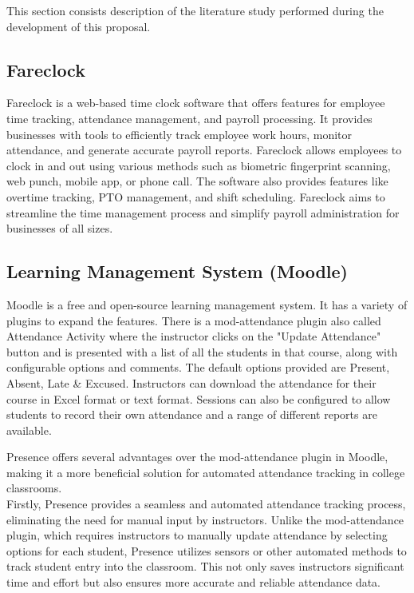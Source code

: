 This section consists description of the literature study performed during the development of this proposal.

\subsection{Fareclock}
Fareclock\cite{fareclock} is a web-based time clock software that offers features for employee time tracking, attendance management, and payroll processing. It provides businesses with tools to efficiently track employee work hours, monitor attendance, and generate accurate payroll reports. Fareclock allows employees to clock in and out using various methods such as biometric fingerprint scanning, web punch, mobile app, or phone call. The software also provides features like overtime tracking, PTO management, and shift scheduling. Fareclock aims to streamline the time management process and simplify payroll administration for businesses of all sizes.

\subsection{Learning Management System (Moodle)}

Moodle is a free and open-source learning management system. It has a variety of plugins to expand the features. There is a mod-attendance\cite{moodle_attendance} plugin also called Attendance Activity\cite{moodle_activity} where the instructor clicks on the "Update Attendance" button and is presented with a list of all the students in that course, along with configurable options and comments. The default options provided are Present, Absent, Late & Excused. Instructors can download the attendance for their course in Excel format or text format. Sessions can also be configured to allow students to record their own attendance and a range of different reports are available.

Presence offers several advantages over the mod-attendance plugin in Moodle, making it a more beneficial solution for automated attendance tracking in college classrooms.\\

Firstly, Presence provides a seamless and automated attendance tracking process, eliminating the need for manual input by instructors. Unlike the mod-attendance plugin, which requires instructors to manually update attendance by selecting options for each student, Presence utilizes sensors or other automated methods to track student entry into the classroom. This not only saves instructors significant time and effort but also ensures more accurate and reliable attendance data.\\

